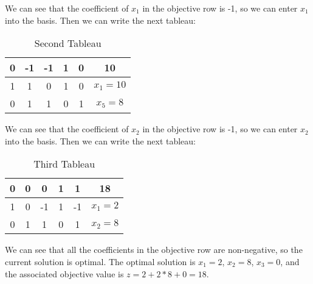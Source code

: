 \documentclass[12pt]{article}
\begin{document}
\begin{enumerate}
\begin{enumerate}
                  We can see that the coefficient of $x_1$ in the objective row is -1, so we can enter $x_1$ into the basis. Then we can write the next tableau:
                  \begin{table}[H]
                      \centering
                      \begin{tabular}{ccccc|c}
                          0 & -1 & -1 & 1 & 0 & 10         \\
                          \hline
                          1 & 1  & 0  & 1 & 0 & $x_1 = 10$ \\
                          0 & 1  & 1  & 0 & 1 & $x_5 = 8$  \\
                      \end{tabular}
                      \caption{Second Tableau}
                  \end{table}
                  We can see that the coefficient of $x_2$ in the objective row is -1, so we can enter $x_2$ into the basis. Then we can write the next tableau:
                  \begin{table}[H]
                      \centering
                      \begin{tabular}{ccccc|c}
                          0 & 0 & 0  & 1 & 1  & 18      \\
                          \hline
                          1 & 0 & -1 & 1 & -1 & $x_1=2$ \\
                          0 & 1 & 1  & 0 & 1  & $x_2=8$ \\
                      \end{tabular}
                      \caption{Third Tableau}
                  \end{table}
                  We can see that all the coefficients in the objective row are non-negative, so the current solution is optimal. The optimal solution is $x_1=2$, $x_2=8$, $x_3=0$, and the associated objective value is $z=2+2*8+0=18$.
        \end{enumerate}
\end{enumerate}
\end{document}
